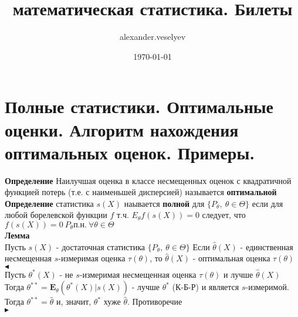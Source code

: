 \documentclass{article}
\title{математическая статистика. Билеты}
\author{alexander.veselyev }
\date{\today}
\begin{document}
\section{Полные статистики. Оптимальные оценки. Алгоритм нахождения оптимальных оценок. Примеры.}
\textbf{Определение} Наилучшая оценка в классе несмещенных оценок с квадратичной функцией потерь (т.е. с наименьшей дисперсией) называется \textbf{оптимальной}\\
\textbf{Определение} статистика $s(X)$ наывается \textbf{полной} для $\{P_\theta,\ \theta\in\Theta\}$
если для любой борелевской функции $f$ т.ч. $E_\theta f(s(X)) = 0$ следует, что $f(s(X)) = 0\ P_\theta\text{п.н.}\ \forall\theta\in\Theta$\\
\textbf{Лемма}\\
Пусть $s(X)$ - достаточная статистика $\{P_\theta,\ \theta\in\Theta\}$ Если $\widehat{\theta}(X)$ - единственная несмещенная $s$-измеримая оценка $\tau(\theta)$, то $\widehat{\theta}(X)$ - оптимальная оценка $\tau(\theta)$\\
$\blacktriangleleft$
\\
Пусть $\theta^*(X)$ - не $s$-измеримая несмещенная оценка $\tau(\theta)$ и лучше $\widehat{\theta}(X)$\\
Тогда $\theta^{**} = \mathbf{E}_\theta(\theta^*(X)|s(X))$ - лучше $\theta^*$ (К-Б-Р) и является $s$-измеримой. Тогда $\theta^{**} = \widehat{\theta}$ и, значит, $\theta^*$ хуже $\widehat{\theta}$. Противоречие\\
$\blacktriangleright$\\
\end{document}
